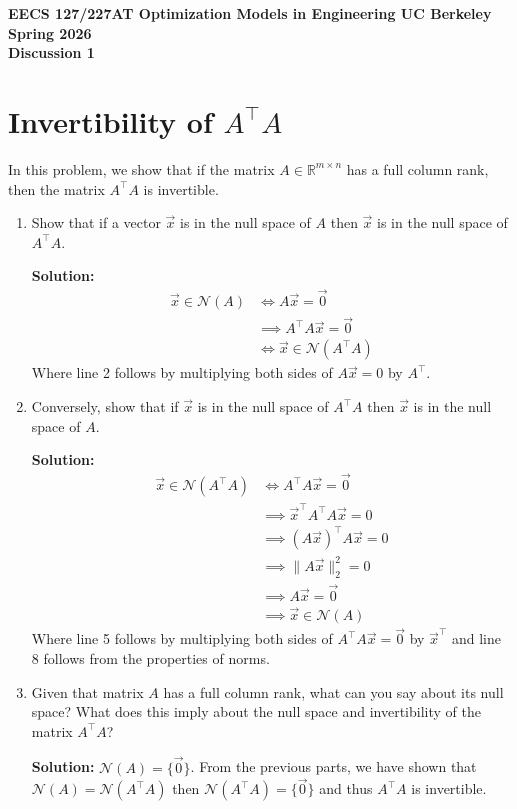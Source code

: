 \documentclass[10pt]{article}
\newcommand{\RR}{\mathbb{R}}
\newcommand{\NN}{\mathcal{N}}
\begin{document}
\begin{center}
{\Large\bfseries EECS 127/227AT \quad Optimization Models in Engineering \quad UC Berkeley \quad Spring 2026}\\[6pt]
{\LARGE\bfseries Discussion 1}
\end{center}

\section{Invertibility of $A^\top A$}

In this problem, we show that if the matrix $A \in \RR^{m \times n}$ has a full column rank, then the matrix $A^\top A$ is invertible.

\begin{enumerate}[label=(\alph*)]
\item Show that if a vector $\vec{x}$ is in the null space of $A$ then $\vec{x}$ is in the null space of $A^\top A$.

\textbf{Solution:}
\begin{align}
\vec{x} \in \NN(A) &\iff A\vec{x} = \vec{0} \\
&\implies A^\top A\vec{x} = \vec{0} \\
&\iff \vec{x} \in \NN\!\left(A^\top A\right)
\end{align}
Where line 2 follows by multiplying both sides of $A\vec{x} = 0$ by $A^\top$.

\item Conversely, show that if $\vec{x}$ is in the null space of $A^\top A$ then $\vec{x}$ is in the null space of $A$.

\textbf{Solution:}
\begin{align}
\vec{x} \in \NN\!\left(A^\top A\right) &\iff A^\top A\vec{x} = \vec{0} \\
&\implies \vec{x}^\top A^\top A\vec{x} = 0 \\
&\implies (A\vec{x})^\top A\vec{x} = 0 \\
&\implies \|A\vec{x}\|_2^2 = 0 \\
&\implies A\vec{x} = \vec{0} \\
&\implies \vec{x} \in \NN(A)
\end{align}
Where line 5 follows by multiplying both sides of $A^\top A\vec{x} = \vec{0}$ by $\vec{x}^\top$ and line 8 follows from the properties of norms.

\item Given that matrix $A$ has a full column rank, what can you say about its null space? What does this imply about the null space and invertibility of the matrix $A^\top A$?

\textbf{Solution:} $\NN(A) = \{\vec{0}\}$. From the previous parts, we have shown that $\NN(A) = \NN\!\left(A^\top A\right)$ then $\NN\!\left(A^\top A\right) = \{\vec{0}\}$ and thus $A^\top A$ is invertible.

\end{enumerate}
\end{document}
